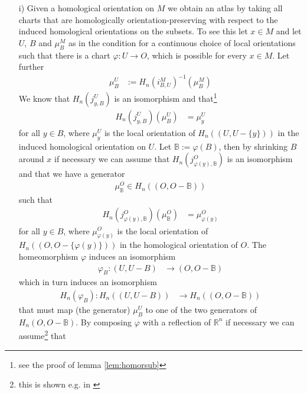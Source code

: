 \begin{prf}
\begin{enumerate}
\item[i)]
Given a homological orientation on $M$ we obtain an atlas by taking all charts that are homologically orientation-preserving with respect to the induced homological orientations on the subsets. To see this let $x \in M$ and let $U$, $B$ and $\mu_{B}^{M}$ as in the condition for a continuous choice of local orientations such that there is a chart $\varphi \colon U \to O$, which is possible for every $x \in M$. Let further
\begin{align*}
  \mu_{B}^{U}
  &:=
  H_{n}(i_{B,U}^{M})^{-1}(\mu_{B}^{M})
\end{align*}
We know that $H_{n}(j_{y,B}^{U})$ is an isomorphism and that\footnote{see the proof of lemma \ref{lem:homorsub}}
\begin{align*}
  H_{n}(j_{y,B}^{U})(\mu_{B}^{U})
  &=
  \mu_{y}^{U}
\end{align*}
for all $y \in B$, where $\mu_{y}^{U}$ is the local orientation of $H_{n}((U,U - \lbrace y \rbrace))$ in the induced homological orientation on $U$. Let $\mathbb{B} := \varphi(B)$, then by shrinking $B$ around $x$ if necessary we can assume that $H_{n}(j_{\varphi(y),\mathbb{B}}^{O})$ is an isomorphism and that we have a generator
\begin{align*}
  \mu_{\mathbb{B}}^{O} \in H_{n}((O,O - \mathbb{B}))
\end{align*}
such that
\begin{align*}
  H_{n}(j_{\varphi(y),\mathbb{B}}^{O})
  \left(
    \mu_{\mathbb{B}}^{O}
  \right)
  &=
  \mu_{\varphi(y)}^{O}
\end{align*}
for all $y \in B$, where $\mu_{\varphi(y)}^{O}$ is the local orientation of $H_{n}((O,O - \lbrace \varphi(y) \rbrace))$ in the homological orientation of $O$. The homeomorphism $\varphi$ induces an isomorphism
\begin{align*}
  \varphi_{B}
  \colon
  (U,U - B)
  &\to
  (O,O - \mathbb{B})
\end{align*}
which in turn induces an isomorphism
\begin{align*}
  H_{n}(\varphi_{B})
  \colon
  H_{n}((U,U - B))
  &\to
  H_{n}((O,O - \mathbb{B}))
\end{align*}
that must map (the generator) $\mu_{B}^{U}$ to one of the two generators of $H_{n}(O,O - \mathbb{B})$. By composing $\varphi$ with a reflection of $\mathbb{R}^{n}$ if necessary we can assume\footnote{this is shown e.g. in \cite{8b5861fc}} that

\end{enumerate}
\end{prf}
